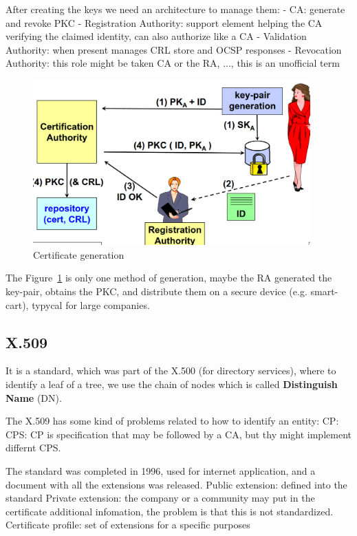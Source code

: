 \documentclass[12pt]{article}
\begin{document}
After creating the keys we need an architecture to manage them:
- CA: generate and revoke PKC
- Registration Authority: support element helping the CA verifying the claimed identity, can also authorize like a CA
- Validation Authority: when present manages CRL store and OCSP responses
- Revocation Authority: this role might be taken CA or the RA, ..., this is an unofficial term
\begin{figure}
  \begin{center}
    \includegraphics[width=0.95\textwidth]{./img/certificate-generation.png}
  \end{center}
  \caption{Certificate generation}\label{fig:certificate-generation}
\end{figure}
The Figure~\ref{fig:certificate-generation} is only one method of generation, maybe the RA generated the key-pair, obtains the PKC, and distribute them on a secure device (e.g. smart-cart), typycal for large companies.

\subsection{X.509}
It is a standard, which was part of the X.500 (for directory services), where to identify a leaf of a tree, we use the chain of nodes which is called \textbf{Distinguish Name} (DN).

The X.509 has some kind of problems related to how to identify an entity:
CP:
CPS:
CP is specification that may be followed by a CA, but thy might implement differnt CPS.

The standard was completed in 1996, used for internet application, and a document with all the extensions was released. 
Public extension: defined into the standard 
Private extension: the company or a community may put in the certificate additional infomation, the problem is that this is not standardized.
Certificate profile: set of extensions for a specific purposes
\end{document}
